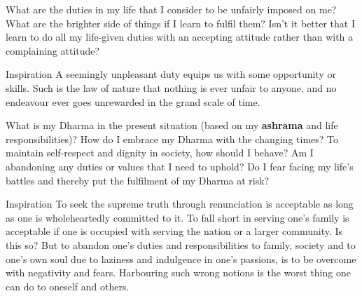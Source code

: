 \newpage
\begin{mananam}{}
\mananamtext What are the duties in my life that I consider to be unfairly imposed on me? What are the brighter side of things if I learn to fulfil them? Isn’t it better that I learn to do all my life-given duties with an accepting attitude rather than with a complaining attitude?
\end{mananam}
\WritingHand{}
\begin{inspiration}{\mananamfont Inspiration}
\mananamtext A seemingly unpleasant duty equips us with some opportunity or skills. Such is the law of nature that nothing is ever unfair to anyone, and no endeavour ever goes unrewarded in the grand scale of time.
\end{inspiration}
\newpage


\newpage
\begin{mananam}{}
\mananamtext What is my Dharma in the present situation (based on my \textbf{ashrama} and life responsibilities)? How do I embrace my Dharma with the changing times? To maintain self-respect and dignity in society, how should I behave? Am I abandoning any duties or values that I need to uphold? Do I fear facing my life’s battles and thereby put the fulfilment of my Dharma at risk?
\end{mananam}
\WritingHand{}
\begin{inspiration}{\mananamfont Inspiration}
\mananamtext To seek the supreme truth through renunciation is acceptable as long as one is wholeheartedly committed to it. To fall short in serving one’s family is acceptable if one is occupied with serving the nation or a larger community. Is this so? But to abandon one’s duties and responsibilities to family, society and to one’s own soul due to laziness and indulgence in one’s passions, is to be overcome with negativity and fears. Harbouring such wrong notions is the worst thing one can do to oneself and others.
\end{inspiration}
\newpage

